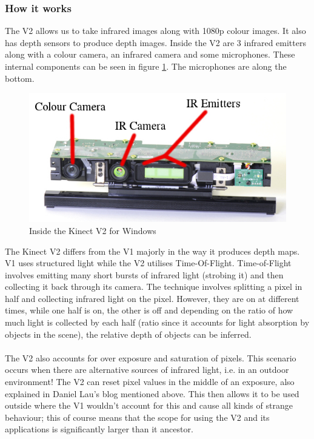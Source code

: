 \documentclass[11pt]{article}
\begin{document}
\subsubsection{How it works} 
The V2 allows us to take infrared images along with 1080p colour images. It 
also has depth sensors to produce depth images. Inside the V2 are 3 infrared
emitters along with a colour camera, an infrared camera and some microphones.
These internal components can be seen in figure \ref{kinectinternal}. The
microphones are along the bottom.
\begin{center}
	\begin{figure}[H]
		\begin{center}
			\includegraphics[scale=0.5]{pics/kinectinternal}
				\caption{Inside the Kinect V2 for Windows}
				\label{kinectinternal}
		\end{center}
	\end{figure}
\end{center}

The Kinect V2 differs from the V1 majorly in the way it produces depth maps.
V1 uses structured light while the V2 utilises Time-Of-Flight. Time-of-Flight
involves emitting many short bursts of infrared light (strobing it) and then
collecting it back through its camera. 
The technique involves splitting a pixel in half and collecting infrared light
on the pixel. However, they are on at different times, while one half is on, 
the other is off and depending on the ratio of how much light is collected 
by each half (ratio since it accounts for light absorption by objects in the scene),
the relative depth of objects can be inferred. \\
\\
The V2 also accounts for over exposure and saturation of pixels. This scenario
occurs when there are alternative sources of infrared light, i.e. in an outdoor
environment! The V2 can reset pixel values in the middle of an exposure, also
explained in Daniel Lau's blog mentioned above. This then
allows it to be used outside where the V1 wouldn't account for this and cause
all kinds of strange behaviour; this of course means that the scope for using
the V2 and its applications is significantly larger than it ancestor.
\\ \\
\end{document}
